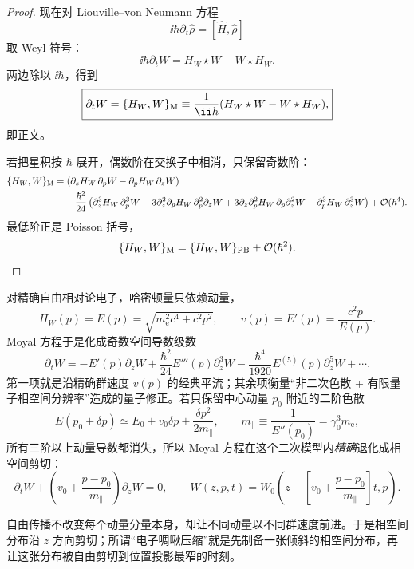 \begin{proof}
现在对 Liouville--von Neumann 方程
\[
\ii\hbar\partial_t\hat\rho
=
[\hat H,\hat\rho]
\]
取 Weyl 符号：
\[
\ii\hbar\partial_tW
=
H_W\star W-W\star H_W.
\]
两边除以 \(\ii\hbar\)，得到
\[
\boxed{
\partial_tW
=
\{H_W,W\}_{\rm M}
\equiv
\frac1{\ii\hbar}
(H_W\star W-W\star H_W),
}
\]
即正文。

若把星积按 \(\hbar\) 展开，偶数阶在交换子中相消，只保留奇数阶：
\begin{align*}
\{H_W,W\}_{\rm M}
&=
\left(
\partial_zH_W\,\partial_pW
-\partial_pH_W\,\partial_zW
\right)\\
&\quad
-\frac{\hbar^2}{24}
\left(
\partial_z^3H_W\,\partial_p^3W
-3\partial_z^2\partial_pH_W\,
  \partial_p^2\partial_zW
+3\partial_z\partial_p^2H_W\,
  \partial_p\partial_z^2W
-\partial_p^3H_W\,\partial_z^3W
\right)
+\mathcal O(\hbar^4).
\end{align*}
最低阶正是 Poisson 括号，
\[
\{H_W,W\}_{\rm M}
=
\{H_W,W\}_{\rm PB}
+\mathcal O(\hbar^2).
\]
\end{proof}


对精确自由相对论电子，哈密顿量只依赖动量，
\[
H_W(p)=E(p)=\sqrt{m_{\mathrm e}^2c^4+c^2p^2},
\qquad
v(p)=E'(p)=\frac{c^2p}{E(p)}.
\]
Moyal 方程于是化成奇数空间导数级数
\begin{equation}
\boxed{
\partial_tW
=-E'(p)\partial_zW
+\frac{\hbar^2}{24}E'''(p)\partial_z^3W
-\frac{\hbar^4}{1920}E^{(5)}(p)\partial_z^5W+\cdots.}
\label{eq:relativistic_free_moyal}
\end{equation}
第一项就是沿精确群速度 $v(p)$ 的经典平流；其余项衡量“非二次色散 + 有限量子相空间分辨率”造成的量子修正。若只保留中心动量 $p_0$ 附近的二阶色散
\[
E(p_0+\delta p)
\simeq E_0+v_0\delta p+\frac{\delta p^2}{2m_\parallel},
\qquad
m_\parallel\equiv\frac{1}{E''(p_0)}=\gamma_0^3m_{\mathrm e},
\]
所有三阶以上动量导数都消失，所以 Moyal 方程在这个二次模型内\emph{精确}退化成相空间剪切：
\begin{equation}
\boxed{
\partial_tW+
\left(v_0+\frac{p-p_0}{m_\parallel}\right)\partial_zW=0,
\qquad
W(z,p,t)=
W_0\!\left(z-\left[v_0+\frac{p-p_0}{m_\parallel}\right]t,p\right).}
\label{eq:wigner_shear}
\end{equation}

自由传播不改变每个动量分量本身，却让不同动量以不同群速度前进。于是相空间分布沿 $z$ 方向剪切；所谓“电子啁啾压缩”就是先制备一张倾斜的相空间分布，再让这张分布被自由剪切到位置投影最窄的时刻。

